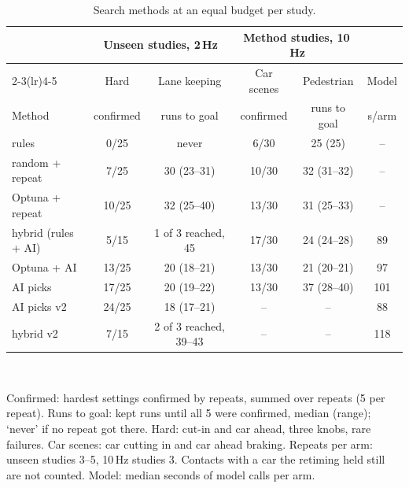 \begin{table}[t]
\caption{Search methods at an equal budget per study.}
\label{tab:methods}
\centering\footnotesize
\setlength{\tabcolsep}{2.5pt}
\begin{tabular}{@{}lccccc@{}}
\toprule
 & \multicolumn{2}{c}{Unseen studies, 2\,Hz} & \multicolumn{2}{c}{Method studies, 10\,Hz} & \\
\cmidrule(lr){2-3}\cmidrule(lr){4-5}
 & Hard & Lane keeping & Car scenes & Pedestrian & Model \\
Method & confirmed & runs to goal & confirmed & runs to goal & s/arm \\
\midrule
rules & 0/25 & never & 6/30 & 25 (25) & -- \\
random + repeat & 7/25 & 30 (23--31) & 10/30 & 32 (31--32) & -- \\
Optuna + repeat & 10/25 & 32 (25--40) & 13/30 & 31 (25--33) & -- \\
hybrid (rules + AI) & 5/15 & 1 of 3 reached, 45 & 17/30 & 24 (24--28) & 89 \\
Optuna + AI & 13/25 & 20 (18--21) & 13/30 & 21 (20--21) & 97 \\
AI picks & 17/25 & 20 (19--22) & 13/30 & 37 (28--40) & 101 \\
AI picks v2 & 24/25 & 18 (17--21) & -- & -- & 88 \\
hybrid v2 & 7/15 & 2 of 3 reached, 39--43 & -- & -- & 118 \\
\bottomrule
\end{tabular}
\\[2pt]\parbox{\columnwidth}{\scriptsize Confirmed: hardest settings confirmed by repeats, summed over repeats (5 per repeat). Runs to goal: kept runs until all 5 were confirmed, median (range); `never' if no repeat got there. Hard: cut-in and car ahead, three knobs, rare failures. Car scenes: car cutting in and car ahead braking. Repeats per arm: unseen studies 3--5, 10\,Hz studies 3. Contacts with a car the retiming held still are not counted. Model: median seconds of model calls per arm.}
\end{table}
